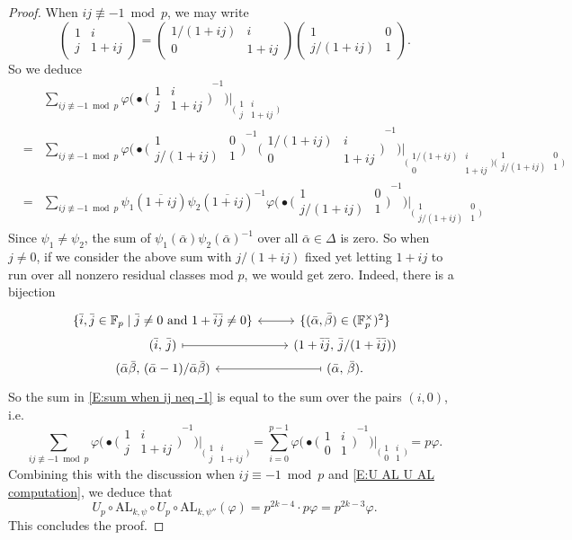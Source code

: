 \documentclass[12pt]{amsart}
\theoremstyle{definition}
\numberwithin{equation}{subsection}
\def\FF{\mathbb{F}}
\newcommand{\AL}{\mathrm{AL}}
\newcommand{\Matrix}[4]{{\big(\begin{smallmatrix}#1&#2\\#3& #4\end{smallmatrix} \big)}}
\newcommand{\MATRIX}[4]{{\begin{pmatrix}#1&#2\\#3& #4\end{pmatrix}}}
\begin{document}
\begin{proof}
When $ij \not\equiv -1 \bmod p$, we may write
$$\MATRIX 1ij{1+ij}  = \MATRIX {1/(1+ij)}i0{1+ij} \MATRIX 10{j/(1+ij)} 1.$$
So we deduce
\begin{eqnarray}
\label{E:sum when ij neq -1}
&&\sum_{ij \not\equiv -1 \bmod p} \varphi \big(\bullet {\Matrix 1ij{1+ij}}^{-1} \big) \big|_{\Matrix 1ij{1+ij}}
\\
\nonumber
&=& \sum_{ij \not\equiv -1 \bmod p} \varphi \big(\bullet {{\Matrix 10{j/(1+ij)} 1}^{-1}\Matrix{1/(1+ij)}i0{1+ij}}^{-1} \big) \big|_{\Matrix {1/(1+ij)}i0{1+ij} \Matrix 10{j/(1+ij)} 1}
\\
\nonumber
& = &
\sum_{ij \not\equiv -1 \bmod p} \psi_1(\overline{1+ij})\psi_2(\overline{1+ij})^{-1} \varphi \big(\bullet {\Matrix 10{j/(1+ij)} 1}^{-1} \big) \big|_{ \Matrix 10{j/(1+ij)} 1}
\end{eqnarray}
Since $\psi_1 \neq \psi_2$, the sum of $\psi_1(\bar \alpha) \psi_2(\bar\alpha)^{-1}$ over all $\bar \alpha  \in \Delta$ is zero. So when $j \neq 0$, if we consider the above sum with $j/(1+ij)$ fixed yet letting $1+ij$ to run over all nonzero residual classes mod $p$,
we would get zero. 
Indeed, there is a bijection
$$
\begin{tikzcd}[row sep = 0pt]
\{\bar i, \bar j \in \FF_p \;|\; \bar j \neq 0 \textrm{ and }1+\bar i \bar j \neq 0 \} \ar[r, leftrightarrow] & \{( \bar \alpha, \bar \beta) \in (\FF_p^\times)^2\}
\\
(\bar i,\, \bar j) \ar[r, mapsto] &  (1+ \bar i \bar j,\, \bar j / (1+\bar i \bar j))
\\
(\bar\alpha \bar \beta,\, (\bar \alpha-1) / \bar \alpha \bar \beta ) & \ar[l, mapsto] (\bar \alpha,\, \bar \beta).
\end{tikzcd}
$$
So the sum in \eqref{E:sum when ij neq -1} is equal to the sum over the pairs $(i,0)$, i.e.
$$\sum_{ij \not\equiv -1 \bmod p} \varphi \big(\bullet {\Matrix 1ij{1+ij}}^{-1} \big) \big|_{\Matrix 1ij{1+ij}} = \sum_{i =0}^{p-1} \varphi \big(\bullet {\Matrix 1i0{1}}^{-1} \big) \big|_{\Matrix 1i0{1}} = p \varphi.
$$
Combining this with the discussion when $ij \equiv -1 \bmod p$ and \eqref{E:U AL U AL computation}, we deduce that
$$U_p \circ \AL_{k, \psi} \circ U_p \circ  \AL_{k, \psi''} (\varphi) = p^{2k-4} \cdot p \varphi = p^{2k-3} \varphi.$$
This concludes the proof.
\end{proof}
\end{document}
